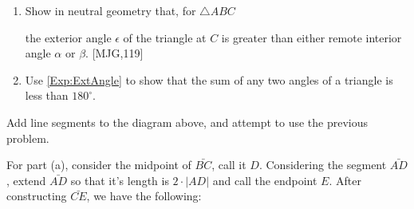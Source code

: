 \documentclass{ximera}
\begin{document}
\begin{question}\hfil
\label{118} 
\begin{enumerate}
\item\label{Exp:ExtAngle} Show in neutral geometry that, for $\triangle ABC$
\begin{image}
\end{image}
the exterior angle $\epsilon$ of the triangle at $C$ is greater than
either remote interior angle $\alpha$ or $\beta$. [MJG,119]
\item Use \ref{Exp:ExtAngle} to show that the sum of any two angles of a triangle is less than $180^{\circ}$.
\end{enumerate}
\begin{solution}
\begin{hint}
Add line segments to the diagram above, and attempt to use the
previous problem.
\end{hint}
\begin{freeResponse} 
For part (a), consider the midpoint of $\bar{BC}$, call it
$D$. Considering the segment $\bar{AD}$, extend $\bar{AD}$ so that
it's length is $2\cdot|AD|$ and call the endpoint $E$. After
constructing $\bar{CE}$, we have the following:
\begin{image}
\end{image}
\end{freeResponse}
\end{solution}
\end{question}
\end{document}
